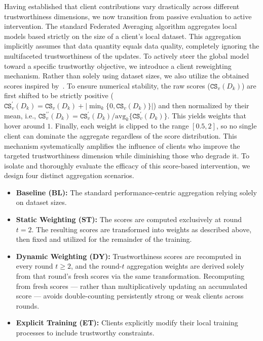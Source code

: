 \documentclass[acmsmall]{acmart}
\begin{document}
Having established that client contributions vary drastically across different trustworthiness dimensions, we now transition from passive evaluation to active intervention. The standard Federated Averaging algorithm aggregates local models based strictly on the size of a client's local dataset. This aggregation implicitly assumes that data quantity equals data quality, completely ignoring the multifaceted trustworthiness of the updates. To actively steer the global model toward a specific trustworthy objective, we introduce a client reweighting mechanism. Rather than solely using dataset sizes, we also utilize the obtained scores inspired by~\cite{velez2026private}. To ensure numerical stability, the raw scores ($\mathtt{CS}_v(D_k)$) are first shifted to be strictly positive ($\mathtt{CS}^\prime_v(D_k)=\mathtt{CS}_v(D_k) + |\min_k\{0, \mathtt{CS}_v(D_k)\}|$) and then normalized by their mean, i.e., $\mathtt{CS}^{\prime\prime}_v(D_k)=\mathtt{CS}^\prime_v(D_k)/\text{avg}_k\{\mathtt{CS}^\prime_v(D_k)\}$. This yields weights that hover around $1$. Finally, each weight is clipped to the range $[0.5, 2]$, so no single client can dominate the aggregate regardless of the score distribution. This mechanism systematically amplifies the influence of clients who improve the targeted trustworthiness dimension while diminishing those who degrade it. To isolate and thoroughly evaluate the efficacy of this score-based intervention, we design four distinct aggregation scenarios. 

\begin{itemize}
    \item \textbf{Baseline (BL):} The standard performance-centric aggregation relying solely on dataset sizes.
    \item \textbf{Static Weighting (ST):} The scores are computed exclusively at round $t=2$. The resulting scores are transformed into weights as described above, then fixed and utilized for the remainder of the training.
    \item \textbf{Dynamic Weighting (DY):} Trustworthiness scores are recomputed in every round $t\geq2$, and the round-$t$ aggregation weights are derived solely from that round's fresh scores via the same transformation. Recomputing from fresh scores --- rather than multiplicatively updating an accumulated score --- avoids double-counting persistently strong or weak clients across rounds.
    \item \textbf{Explicit Training (ET):} Clients explicitly modify their local training processes to include trustworthy constraints.
\end{itemize}
\end{document}
